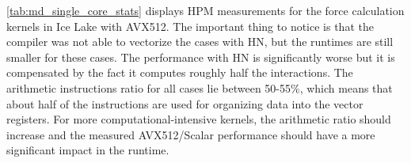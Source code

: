 \documentclass[preprint,12pt]{elsarticle}
\begin{document}
\autoref{tab:md_single_core_stats} displays HPM measurements for the force calculation kernels in Ice Lake with AVX512.
The important thing to notice is that the compiler was not able to vectorize the cases with \ac{HN}, but the runtimes are still smaller for these cases.
The performance with \ac{HN} is significantly worse but it is compensated by the fact it computes roughly half the interactions.
The arithmetic instructions ratio for all cases lie between 50-55\%, which means that about half of the instructions are used for organizing data into the vector registers.
For more computational-intensive kernels, the arithmetic ratio should increase and the measured AVX512/Scalar performance should have a more significant impact in the runtime.


\end{document}
